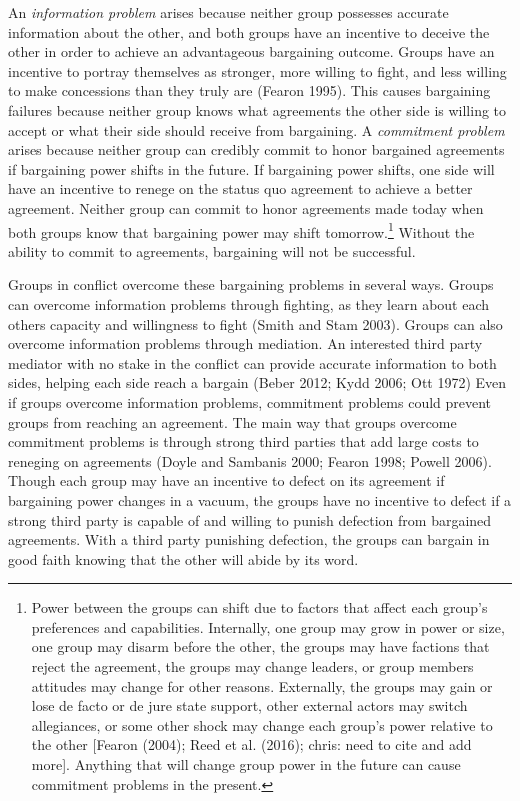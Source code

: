 \documentclass[11pt]{article}
\begin{document}
An \emph{information problem} arises because neither group possesses
accurate information about the other, and both groups have an incentive
to deceive the other in order to achieve an advantageous bargaining
outcome. Groups have an incentive to portray themselves as stronger,
more willing to fight, and less willing to make concessions than they
truly are (Fearon 1995). This causes bargaining failures because neither
group knows what agreements the other side is willing to accept or what
their side should receive from bargaining. A \emph{commitment problem}
arises because neither group can credibly commit to honor bargained
agreements if bargaining power shifts in the future. If bargaining power
shifts, one side will have an incentive to renege on the status quo
agreement to achieve a better agreement. Neither group can commit to
honor agreements made today when both groups know that bargaining power
may shift tomorrow.\footnote{Power between the groups can shift due to
  factors that affect each group's preferences and capabilities.
  Internally, one group may grow in power or size, one group may disarm
  before the other, the groups may have factions that reject the
  agreement, the groups may change leaders, or group members attitudes
  may change for other reasons. Externally, the groups may gain or lose
  de facto or de jure state support, other external actors may switch
  allegiances, or some other shock may change each group's power
  relative to the other {[}Fearon (2004); Reed et al. (2016); chris:
  need to cite and add more{]}. Anything that will change group power in
  the future can cause commitment problems in the present.} Without the
ability to commit to agreements, bargaining will not be successful.

Groups in conflict overcome these bargaining problems in several ways.
Groups can overcome information problems through fighting, as they learn
about each others capacity and willingness to fight (Smith and Stam
2003). Groups can also overcome information problems through mediation.
An interested third party mediator with no stake in the conflict can
provide accurate information to both sides, helping each side reach a
bargain (Beber 2012; Kydd 2006; Ott 1972) Even if groups overcome
information problems, commitment problems could prevent groups from
reaching an agreement. The main way that groups overcome commitment
problems is through strong third parties that add large costs to
reneging on agreements (Doyle and Sambanis 2000; Fearon 1998; Powell
2006). Though each group may have an incentive to defect on its
agreement if bargaining power changes in a vacuum, the groups have no
incentive to defect if a strong third party is capable of and willing to
punish defection from bargained agreements. With a third party punishing
defection, the groups can bargain in good faith knowing that the other
will abide by its word.
\end{document}
